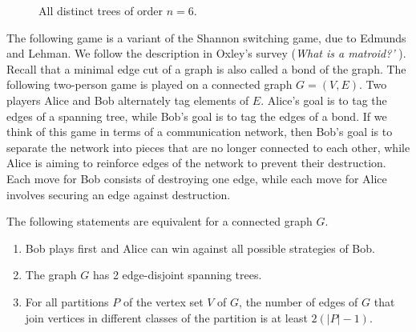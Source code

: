 \begin{figure}[!htbp]
{
}
\quad
\caption{All distinct trees of order $n = 6$.}
\label{fig:trees_forests:distinct_trees_specified_order_6}
\end{figure}

The following game is a variant of the Shannon switching game, due to
Edmunds and Lehman. We follow the description
in Oxley's survey ({\it What is a matroid?'}
{\color{red}{add reference later}}). Recall that a minimal edge cut of
a graph is also called a bond of the graph. The following
two-person game is played on a connected graph $G = (V,E)$. Two
players Alice and Bob alternately tag elements of $E$. Alice's goal is
to tag the edges of a spanning tree, while Bob's goal is to tag the
edges of a bond. If we think of this game in terms of a communication
network, then Bob's goal is to separate the network into pieces that
are no longer connected to each other, while Alice is aiming to
reinforce edges of the network to prevent their destruction. Each move
for Bob consists of destroying one edge, while each move for Alice
involves securing an edge against destruction.

\begin{theorem}
The following statements are equivalent for a connected graph $G$.
%
\begin{enumerate}
\item Bob plays first and Alice can win against all possible
  strategies of Bob.

\item The graph $G$ has 2 edge-disjoint spanning trees.

\item For all partitions $P$ of the vertex set $V$ of $G$, the number
  of edges of $G$ that join vertices in different classes of the
  partition is at least $2(|P| - 1)$.
\end{enumerate}
\end{theorem}

